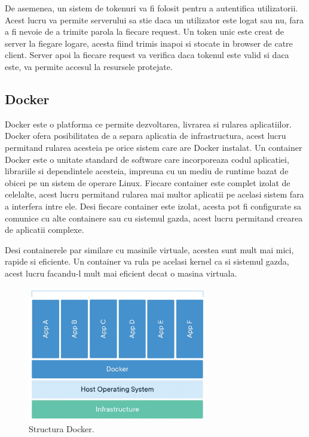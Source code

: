 \documentclass[titlepage,12pt]{article}
\begin{document}
De asemenea, un sistem de tokenuri va fi folosit pentru a autentifica utilizatorii.
Acest lucru va permite serverului sa stie daca un utilizator este logat sau nu, fara a fi nevoie de a trimite parola la fiecare request.
Un token unic este creat de server la fiegare logare, acesta fiind trimis inapoi si stocate in browser de catre client.
Server apoi la fiecare request va verifica daca tokenul este valid si daca este, va permite accesul la resursele protejate.

\subsection {Docker}

Docker\cite{ref:docker} este o platforma ce permite dezvoltarea, livrarea si rularea aplicatiilor.
Docker ofera posibilitatea de a separa aplicatia de infrastructura, acest lucru permitand rularea acesteia pe orice sistem care are Docker instalat.
Un container Docker este o unitate standard de software care incorporeaza codul aplicatiei, librariile si dependintele acesteia, impreuna cu un mediu de runtime bazat de obicei pe un sistem de operare Linux.
Fiecare container este complet izolat de celelalte, acest lucru permitand rularea mai multor aplicatii pe acelasi sistem fara a interfera intre ele.
Desi fiecare container este izolat, acesta pot fi configurate sa comunice cu alte containere sau cu sistemul gazda, acest lucru permitand crearea de aplicatii complexe.

Desi containerele par similare cu masinile virtuale, acestea sunt mult mai mici, rapide si eficiente.
Un container va rula pe acelasi kernel ca si sistemul gazda, acest lucru facandu-l mult mai eficient decat o masina virtuala.

\begin{figure}[H]
    \centering
    \includegraphics[width=0.7\textwidth]{images/dockerstructure}
    \caption{Structura Docker.}
    \label{fig:containerstructure}
\end{figure}
\end{document}
